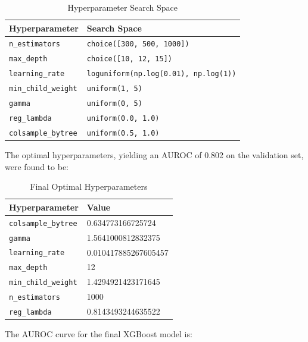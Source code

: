 \documentclass[letterpaper]{article}
\begin{document}
	\begin{table}[H]
		\centering
		\caption{Hyperparameter Search Space}
		\begin{tabular}{ll}
			\hline
			Hyperparameter & Search Space \\
			\hline
			\texttt{n\_estimators} & \texttt{choice([300, 500, 1000])} \\
			\texttt{max\_depth} & \texttt{choice([10, 12, 15])} \\
			\texttt{learning\_rate} & \texttt{loguniform(np.log(0.01), np.log(1))} \\
			\texttt{min\_child\_weight} & \texttt{uniform(1, 5)} \\
			\texttt{gamma} & \texttt{uniform(0, 5)} \\
			\texttt{reg\_lambda} & \texttt{uniform(0.0, 1.0)} \\
			\texttt{colsample\_bytree} & \texttt{uniform(0.5, 1.0)} \\
			\hline
		\end{tabular}
		\label{tab:hyperparameter_search_space}
	\end{table}
	
	The optimal hyperparameters, yielding an AUROC of 0.802 on the validation set, were found to be:
	
	\begin{table}[H]
		\centering
		\caption{Final Optimal Hyperparameters}
		\begin{tabular}{ll}
			\hline
			Hyperparameter & Value \\
			\hline
			\texttt{colsample\_bytree} & 0.634773166725724 \\
			\texttt{gamma} & 1.5641000812832375 \\
			\texttt{learning\_rate} & 0.010417885267605457 \\
			\texttt{max\_depth} & 12 \\
			\texttt{min\_child\_weight} & 1.4294921423171645 \\
			\texttt{n\_estimators} & 1000 \\
			\texttt{reg\_lambda} & 0.8143493244635522 \\
			\hline
		\end{tabular}
		\label{tab:optimal_hyperparameters}
	\end{table}
	
	The AUROC curve for the final XGBoost model is:
	
\end{document}
